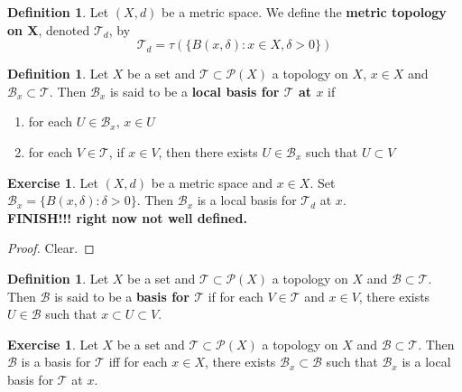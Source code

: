 \documentclass[12pt]{amsart}
\theoremstyle{definition}
\newtheorem{defn}[definition]{Definition}
\newtheorem{ex}[definition]{Exercise}
\newcommand{\del}{\delta}
\newcommand{\MB}{\mathcal{B}}
\newcommand{\MP}{\mathcal{P}}
\newcommand{\MT}{\mathcal{T}}
\newcommand{\tbf}[1]{\textbf{#1}}
\DeclareMathOperator*{\0}{\mbf{0}}
\DeclareMathOperator*{\1}{\mbf{1}}
\newcommand{\lex}[1]{\label{ex:#1}}
\newcommand{\ld}[1]{\label{defn:#1}}
\begin{document}
	\begin{defn} \ld{31004}
	Let $(X,d)$ be a metric space. We define the \tbf{metric topology on X}, denoted $\MT_d$, by $$\MT_d = \tau(\{B(x, \del): x \in X, \del >0\})$$
	\end{defn}
	
	\begin{defn} \ld{31005}
	Let $X$ be a set and $\MT \subset \MP(X)$ a topology on $X$, $x \in X$ and $\MB_x \subset \MT$. Then $\MB_x$ is said to be a \tbf{local basis for $\MT$ at $x$} if 
	\begin{enumerate}
	\item for each $U \in \MB_x$, $x \in U$
	\item for each $V \in \MT$, if $x \in V$, then there exists $U \in \MB_x$ such that $U \subset V$
	\end{enumerate}
	\end{defn}
	
	\begin{ex} \lex{31006}
	Let $(X,d)$ be a metric space and $x \in X$. Set $\MB_x = \{B(x, \del): \del > 0\}$. Then $\MB_x$ is a local basis for $\MT_d$ at $x$. \\
	\tbf{FINISH!!! right now not well defined.}
	\end{ex}	
	
	\begin{proof}
	Clear.
	\end{proof}
	
	\begin{defn} \ld{31006.5}
	Let $X$ be a set and $\MT \subset \MP(X)$ a topology on $X$ and $\MB \subset \MT$. Then $\MB$ is said to be a \tbf{basis for $\MT$} if for each $V \in \MT$ and $x \in V$, there exists $U \in \MB$ such that $x \subset U \subset V$.
	\end{defn}

	\begin{ex} \lex{31007}
	Let $X$ be a set and $\MT \subset \MP(X)$ a topology on $X$ and $\MB \subset \MT$. Then $\MB$ is a basis for $\MT$ iff for each $x \in X$, there exists $\MB_x \subset \MB$ such that $\MB_x$ is a local basis for $\MT$ at $x$. 
	\end{ex}
\end{document}
